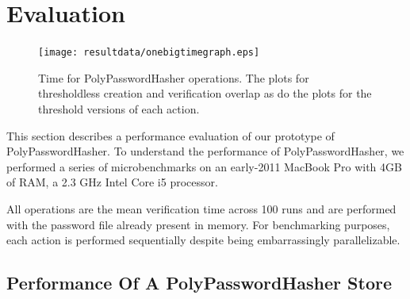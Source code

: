 \section{Evaluation}
\label{sec-evaluation}

\begin{figure}[t]
    \texttt{[image: resultdata/onebigtimegraph.eps]}
	\caption{Time for PolyPasswordHasher operations.  The plots for thresholdless
creation and verification overlap as do the plots for the threshold versions
of each action.}
	\label{fig:time_basic_operations}  
\end{figure}
This section describes a performance evaluation of our prototype of 
PolyPasswordHasher.   
To understand the performance of PolyPasswordHasher,
we performed a series of microbenchmarks on an early-2011 MacBook Pro with 
4GB of RAM, a 2.3 GHz Intel Core i5 processor.  


%

All operations are the mean verification time across 100 runs and
are performed with the password file already present in
memory.  
For benchmarking purposes, each action is performed sequentially despite being 
embarrassingly parallelizable.


\subsection{Performance Of A PolyPasswordHasher Store}


